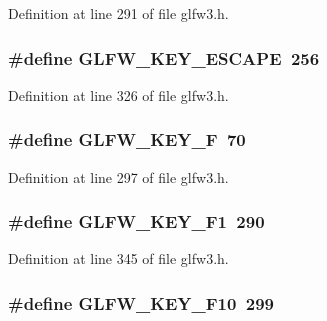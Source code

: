 Definition at line 291 of file glfw3.\-h.

\hypertarget{group__keys_gaac6596c350b635c245113b81c2123b93}{
\subsubsection[{G\-L\-F\-W\-\_\-\-K\-E\-Y\-\_\-\-E\-S\-C\-A\-P\-E}]{\setlength{\rightskip}{0pt plus 5cm}\#define G\-L\-F\-W\-\_\-\-K\-E\-Y\-\_\-\-E\-S\-C\-A\-P\-E~256}}\label{group__keys_gaac6596c350b635c245113b81c2123b93}


Definition at line 326 of file glfw3.\-h.

\hypertarget{group__keys_ga5df402e02aca08444240058fd9b42a55}{
\subsubsection[{G\-L\-F\-W\-\_\-\-K\-E\-Y\-\_\-\-F}]{\setlength{\rightskip}{0pt plus 5cm}\#define G\-L\-F\-W\-\_\-\-K\-E\-Y\-\_\-\-F~70}}\label{group__keys_ga5df402e02aca08444240058fd9b42a55}


Definition at line 297 of file glfw3.\-h.

\hypertarget{group__keys_gafb8d66c573acf22e364049477dcbea30}{
\subsubsection[{G\-L\-F\-W\-\_\-\-K\-E\-Y\-\_\-\-F1}]{\setlength{\rightskip}{0pt plus 5cm}\#define G\-L\-F\-W\-\_\-\-K\-E\-Y\-\_\-\-F1~290}}\label{group__keys_gafb8d66c573acf22e364049477dcbea30}


Definition at line 345 of file glfw3.\-h.

\hypertarget{group__keys_ga718d11d2f7d57471a2f6a894235995b1}{
\subsubsection[{G\-L\-F\-W\-\_\-\-K\-E\-Y\-\_\-\-F10}]{\setlength{\rightskip}{0pt plus 5cm}\#define G\-L\-F\-W\-\_\-\-K\-E\-Y\-\_\-\-F10~299}}\label{group__keys_ga718d11d2f7d57471a2f6a894235995b1}


